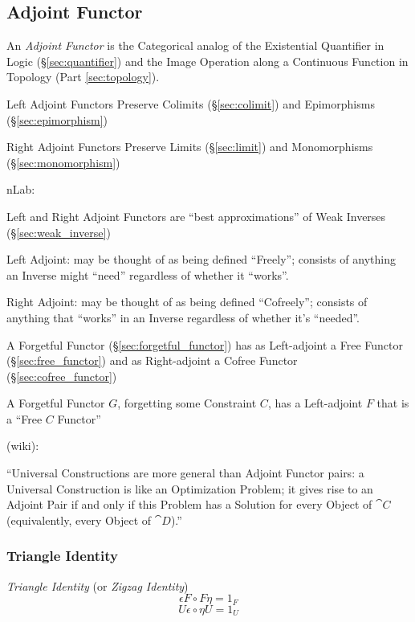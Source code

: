 \subsection{Adjoint Functor}\label{sec:adjoint_functor}

An \emph{Adjoint Functor} is the Categorical analog of the Existential
Quantifier in Logic (\S\ref{sec:quantifier}) and the Image Operation
along a Continuous Function in Topology (Part \ref{sec:topology}).

Left Adjoint Functors Preserve Colimits (\S\ref{sec:colimit}) and
Epimorphisms (\S\ref{sec:epimorphism})

Right Adjoint Functors Preserve Limits (\S\ref{sec:limit}) and
Monomorphisms (\S\ref{sec:monomorphism})

nLab:

Left and Right Adjoint Functors are ``best approximations'' of Weak
Inverses (\S\ref{sec:weak_inverse})

Left Adjoint: may be thought of as being defined ``Freely''; consists
of anything an Inverse might ``need'' regardless of whether it
``works''.

Right Adjoint: may be thought of as being defined ``Cofreely'';
consists of anything that ``works'' in an Inverse regardless of
whether it's ``needed''.

A Forgetful Functor (\S\ref{sec:forgetful_functor}) has as
Left-adjoint a Free Functor (\S\ref{sec:free_functor}) and as
Right-adjoint a Cofree Functor (\S\ref{sec:cofree_functor})

A Forgetful Functor $G$, forgetting some Constraint $C$, has a
Left-adjoint $F$ that is a ``Free $C$ Functor'' %

(wiki):

``Universal Constructions are more general than Adjoint Functor pairs: a
Universal Construction is like an Optimization Problem; it gives rise to an
Adjoint Pair if and only if this Problem has a Solution for every Object of
$\cat{C}$ (equivalently, every Object of $\cat{D}$).''



\subsubsection{Triangle Identity}\label{sec:triangle_identity}

\emph{Triangle Identity} (or \emph{Zigzag Identity})
\[
  \epsilon F \circ F \eta = 1_F
\]\[
  U \epsilon \circ \eta U = 1_U
\]



